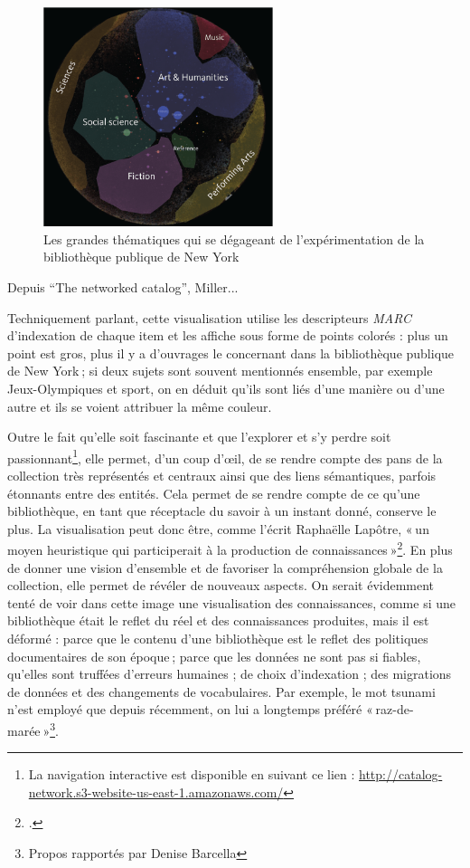 \begin{figure}[h!]
	\centering
	\includegraphics[width=0.6\textwidth]{images/image12.png}
	\caption{Les grandes thématiques qui se dégageant de l'expérimentation de la bibliothèque publique de New York}
	\label{fig:image12}
\end{figure}

\begin{center}
	Depuis \enquote{The networked catalog}, Miller...
\end{center}


Techniquement parlant, cette visualisation utilise les descripteurs \textit{MARC} d’indexation de chaque item et les affiche sous forme de points colorés : plus un point est gros, plus il y a d’ouvrages le concernant dans la bibliothèque publique de New York ; si deux sujets sont souvent mentionnés ensemble, par exemple Jeux-Olympiques et sport, on en déduit qu’ils sont liés d’une manière ou d’une autre et ils se voient attribuer la même couleur.

Outre le fait qu’elle soit fascinante et que l’explorer et s’y perdre soit passionnant\footnote{La navigation interactive est disponible en suivant ce lien : \url{ http://catalog-network.s3-website-us-east-1.amazonaws.com/}}, elle permet, d’un coup d’œil, de se rendre compte des pans de la collection très représentés et centraux ainsi que des liens sémantiques, parfois étonnants entre des entités. Cela permet de se rendre compte de ce qu’une bibliothèque, en tant que réceptacle du savoir à un instant donné, conserve le plus. La visualisation peut donc être, comme l’écrit Raphaëlle Lapôtre, « un moyen heuristique qui participerait à la production de connaissances »\footcite[§ 23]{lapotre_visualiser_2016}. En plus de donner une vision d’ensemble et de favoriser la compréhension globale de la collection, elle permet de révéler de nouveaux aspects. On serait évidemment tenté de voir dans cette image une visualisation des connaissances, comme si une bibliothèque était le reflet du réel et des connaissances produites, mais il est déformé : parce que le contenu d’une bibliothèque est le reflet des politiques documentaires de son époque ; parce que les données ne sont pas si fiables, qu’elles sont truffées d’erreurs humaines ; de choix d’indexation ; des migrations de données et des changements de vocabulaires. Par exemple, le mot tsunami n’est employé que depuis récemment, on lui a longtemps préféré « raz-de-marée »\footnote{Propos rapportés par Denise Barcella}.

